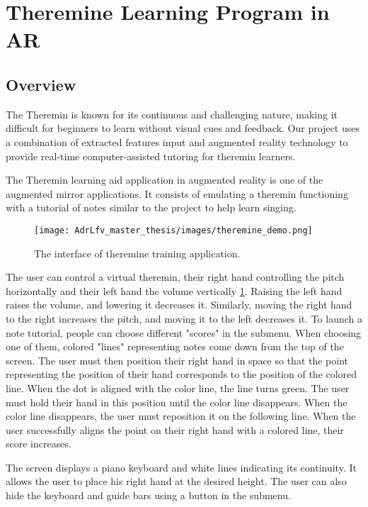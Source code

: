 \section{Theremine Learning Program in AR}

\subsection{Overview}

The Theremin is known for its continuous and challenging nature, making it difficult for beginners to learn without visual cues and feedback. Our project uses a combination of extracted features input and augmented reality technology to provide real-time computer-assisted tutoring for theremin learners.

The Theremin learning aid application in augmented reality is one of the augmented mirror applications. It consists of emulating a theremin functioning with a tutorial of notes similar to the project to help learn singing. 

\begin{figure}[h]
    \centering
    \texttt{[image: AdrLfv\_master\_thesis/images/theremine\_demo.png]}
    \caption{The interface of theremine training application.}
    \label{fig:theremine_demo}
\end{figure}

The user can control a virtual theremin, their right hand controlling the pitch horizontally and their left hand the volume vertically \ref{fig:theremine_demo}. Raising the left hand raises the volume, and lowering it decreases it. Similarly, moving the right hand to the right increases the pitch, and moving it to the left decreases it. 
To launch a note tutorial, people can choose different "scores" in the submenu. When choosing one of them, colored "lines" representing notes come down from the top of the screen.
The user must then position their right hand in space so that the point representing the position of their hand corresponds to the position of the colored line. When the dot is aligned with the color line, the line turns green. The user must hold their hand in this position until the color line disappears. When the color line disappears, the user must reposition it on the following line. When the user successfully aligns the point on their right hand with a colored line, their score increases.

The screen displays a piano keyboard and white lines indicating its continuity. It allows the user to place his right hand at the desired height. The user can also hide the keyboard and guide bars using a button in the submenu.


